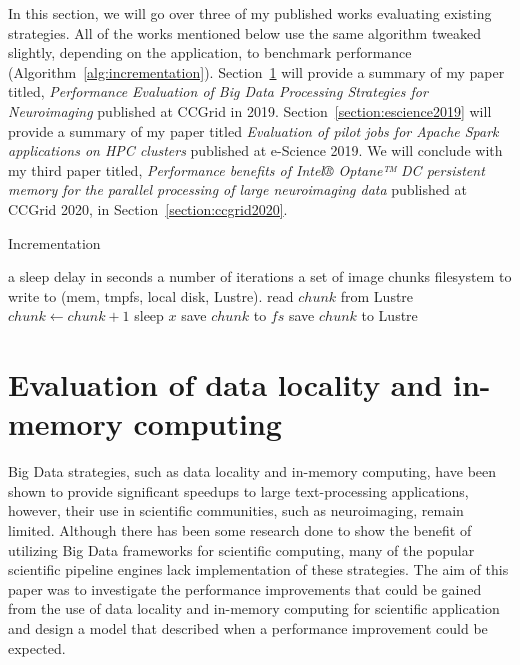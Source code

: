 \documentclass{report}
\newcommand{\Desc}[2]{\State \makebox[2em][l]{#1}#2}
\begin{document}
        In this section, we will go over three of my published works evaluating existing
        strategies. All of the works mentioned below use the same algorithm tweaked
        slightly, depending on the application, to benchmark
        performance (Algorithm~\ref{alg:incrementation}). Section~\ref{section:ccgrid2019} will provide a summary of my
        paper titled, \textit{Performance Evaluation of Big Data Processing Strategies for Neuroimaging}
        published at CCGrid in 2019. Section~\ref{section:escience2019} will provide
        a summary of my paper titled \textit{Evaluation of pilot jobs for Apache Spark applications on HPC clusters} published at
        e-Science 2019. We will conclude with my third paper titled,
        \textit{Performance benefits of Intel® Optane™ DC persistent memory for the parallel processing of large neuroimaging data}
        published at CCGrid 2020, in Section~\ref{section:ccgrid2020}.

            \begin{algorithm}\caption{Incrementation}\label{alg:incrementation}
            \begin{algorithmic}[1]
            \Input
            \Desc{$x$}{a sleep delay in seconds}
            \Desc{$n$}{a number of iterations}
            \Desc{$C$}{a set of image chunks}
            \Desc{$fs$}{filesystem to write to (mem, tmpfs, local disk, Lustre).}
            \EndInput
            \State read $chunk$ from Lustre
                \State $chunk\gets chunk+1$
                \State sleep $x$
                \State save $chunk$ to $fs$
                \EndIf
            \EndFor
            \State save $chunk$ to Lustre
            \EndFor
        \end{algorithmic}
        \end{algorithm}
        
        \section{Evaluation of data locality and in-memory computing}\label{section:ccgrid2019}

        Big Data strategies, such as data locality and in-memory computing, have been shown 
        to provide significant speedups to large text-processing applications, however,
        their use in scientific communities, such as neuroimaging, remain limited. 
        Although there has been some research done to show the benefit of utilizing
        Big Data frameworks for scientific computing, many of the popular scientific
        pipeline engines lack implementation of these strategies. The aim of this paper
        was to investigate the performance improvements that could be gained
        from the use of data locality and in-memory computing for scientific application 
        and design a model that described when a performance improvement could be expected.
        
\end{document}

